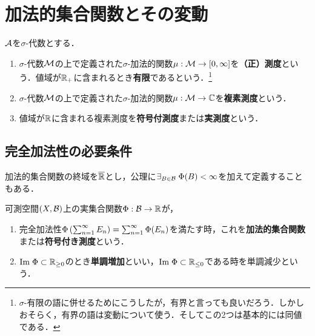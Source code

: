 \documentclass[uplatex, dvipdfmx]{jsreport}
\begin{document}
\section{加法的集合関数とその変動}

\begin{tcolorbox}[colframe=ForestGreen, colback=ForestGreen!10!white,breakable,colbacktitle=ForestGreen!40!white,coltitle=black,fonttitle=\bfseries\sffamily,
    title=]
    \begin{definition}
        $\mathcal{A}$を$\sigma$-代数とする．
        \begin{enumerate}
            \item $\sigma$-代数$\mathcal{M}$の上で定義された$\sigma$-加法的関数$\mu:\mathcal{M}\to[0,\infty]$を\textbf{（正）測度}という．値域が$\mathbb{R}_+$に含まれるとき\textbf{有限}であるという．\footnote{$\sigma$-有限の語に併せるためにこうしたが，有界と言っても良いだろう．しかしおそらく，有界の語は変動について使う．そしてこの2つは基本的には同値である．}
            \item $\sigma$-代数$\mathcal{M}$の上で定義された$\sigma$-加法的関数$\mu:\mathcal{M}\to\mathbb{C}$を\textbf{複素測度}という．
            \item 値域が$\mathbb{R}$に含まれる複素測度を\textbf{符号付測度}または\textbf{実測度}という．
        \end{enumerate}
    \end{definition}
\end{tcolorbox}

\subsection{完全加法性の必要条件}

\begin{tcolorbox}[colframe=ForestGreen, colback=ForestGreen!10!white,breakable,colbacktitle=ForestGreen!40!white,coltitle=black,fonttitle=\bfseries\sffamily,
title=]
    加法的集合関数の終域を$\overline{\mathbb{R}}$とし，公理に$\exists_{B\in\mathcal{B}}\;\Phi(B)<\infty$を加えて定義することもある\cite{吉田耕作}．
\end{tcolorbox}

\begin{definition}
    可測空間$(X,\mathcal{B})$上の実集合関数$\Phi:\mathcal{B}\to\mathbb{R}$が，
    \begin{enumerate}
        \item 完全加法性$\Phi\left(\sum^\infty_{n=1}E_n\right)=\sum^\infty_{n=1}\Phi(E_n)$を満たす時，これを\textbf{加法的集合関数}または\textbf{符号付き測度}という．
        \item $\mathrm{Im}\;\Phi\subset\mathbb{R}_{\ge 0}$のとき\textbf{単調増加}といい，$\mathrm{Im}\;\Phi\subset\mathbb{R}_{\le 0}$である時を単調減少という．
    \end{enumerate}
\end{definition}
\end{document}
